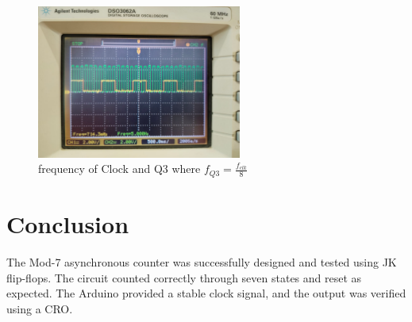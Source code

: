 \documentclass[a4paper,12pt]{article}
\begin{document}
\begin{figure}[H]
\centering
\includegraphics[width=0.6\textwidth]{figs/fig3.jpeg}
\caption{frequency of Clock and Q3 where $f_{Q3} = \frac{f_{clk}}{8}$}
\end{figure}
\section{Conclusion}
The Mod-7 asynchronous counter was successfully designed and tested using JK flip-flops. The circuit counted correctly through seven states and reset as expected. The Arduino provided a stable clock signal, and the output was verified using a CRO.
\end{document}
